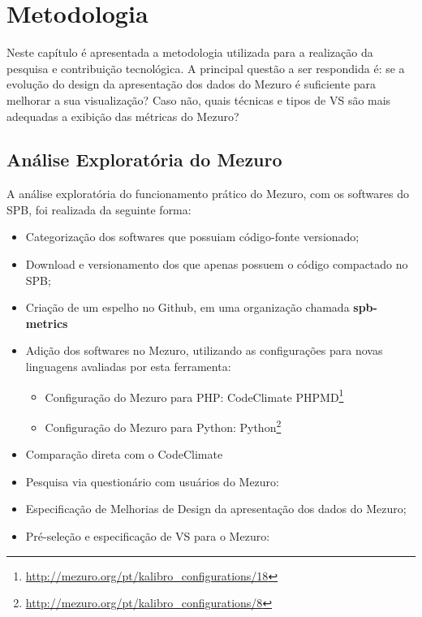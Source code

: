 \chapter{Metodologia}\label{metodologia}

Neste capítulo é apresentada a metodologia utilizada para a
realização da pesquisa e contribuição tecnológica. A principal questão
a ser respondida é: se a evolução do design da apresentação dos dados do Mezuro
é suficiente para melhorar a sua visualização? Caso não, quais técnicas e
tipos de VS são mais adequadas a exibição das métricas do Mezuro?



\section{Análise Exploratória do Mezuro}


A análise exploratória do funcionamento prático do Mezuro, com os softwares do
SPB, foi realizada da seguinte forma:


\begin{itemize}
  \item Categorização dos softwares que possuiam código-fonte versionado;
  \item Download e versionamento dos que apenas possuem o código compactado no SPB;
  \item Criação de um espelho no Github, em uma organização chamada \textbf{spb-metrics}
  \item Adição dos softwares no Mezuro, utilizando as configurações para novas
  linguagens avaliadas por esta ferramenta:
    \begin{itemize}
        \item Configuração do Mezuro para PHP: CodeClimate
              PHPMD\footnote{\url{http://mezuro.org/pt/kalibro\_configurations/18}}
      \item Configuração do Mezuro para Python:
              Python\footnote{\url{http://mezuro.org/pt/kalibro\_configurations/8}}
    \end{itemize}
  \item Comparação direta com o CodeClimate
  \item Pesquisa via questionário com usuários do Mezuro:
  \item Especificação de Melhorias de Design da apresentação dos dados do Mezuro;
  \item Pré-seleção e especificação de VS para o Mezuro:
\end{itemize}

